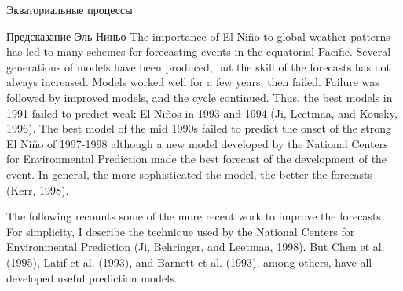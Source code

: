 \begin{chapter}{Экваториальные процессы}
\begin{section}{Предсказание Эль-Ниньо}
The
importance of El Ni\~{n}o to global weather patterns has led to many
schemes for forecasting events in the equatorial Pacific. Several
generations of models have been produced, but the skill of the
forecasts has not always increased. Models worked well for a few
years, then failed. Failure was followed by improved models, and the
cycle continued. Thus, the best models in 1991 failed to predict weak
El Ni\~{n}os in 1993 and 1994 (Ji, Leetmaa, and Kousky, 1996). The
best model of the mid 1990s failed to predict the onset of the strong
El Ni\~{n}o of 1997-1998 although a new model developed by the
National Centers for Environmental Prediction made the best forecast
of the development of the event. In general, the more sophisticated
the model, the better the forecasts (Kerr, 1998).
%

The following recounts some of the more recent work to improve the
forecasts.  For simplicity, I describe the technique used by the
National Centers for Environmental Prediction (Ji, Behringer, and
Leetmaa, 1998). But Chen et al.  (1995), Latif et al. (1993), and
Barnett et al. (1993), among others, have all developed useful
prediction models.
%


\end{section}
\end{chapter}

